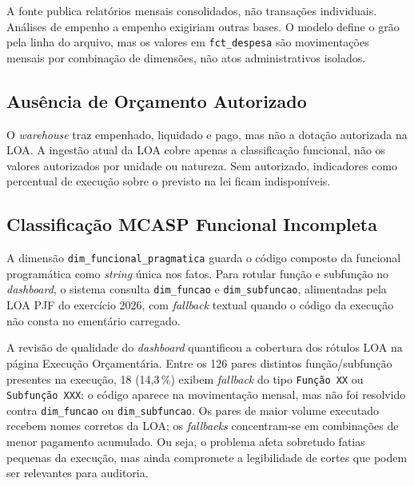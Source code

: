 A fonte publica relatórios mensais consolidados, não transações individuais. Análises de empenho a empenho exigiriam outras bases. O modelo define o grão pela linha do arquivo, mas os valores em \texttt{fct\_despesa} são movimentações mensais por combinação de dimensões, não atos administrativos isolados.

\subsection{Ausência de Orçamento Autorizado}

O \textit{warehouse} traz empenhado, liquidado e pago, mas não a dotação autorizada na LOA. A ingestão atual da LOA cobre apenas a classificação funcional, não os valores autorizados por unidade ou natureza. Sem autorizado, indicadores como percentual de execução sobre o previsto na lei ficam indisponíveis.

\subsection{Classificação MCASP Funcional Incompleta}

A dimensão \texttt{dim\_funcional\_pragmatica} guarda o código composto da funcional programática como \textit{string} única nos fatos. Para rotular função e subfunção no \textit{dashboard}, o sistema consulta \texttt{dim\_funcao} e \texttt{dim\_subfuncao}, alimentadas pela LOA PJF do exercício 2026, com \textit{fallback} textual quando o código da execução não consta no ementário carregado.


A revisão de qualidade do \textit{dashboard} quantificou a cobertura dos rótulos LOA na página Execução Orçamentária. Entre os 126 pares distintos função/subfunção presentes na execução, 18 (14{,}3\,\%) exibem \textit{fallback} do tipo \texttt{Função XX} ou \texttt{Subfunção XXX}: o código aparece na movimentação mensal, mas não foi resolvido contra \texttt{dim\_funcao} ou \texttt{dim\_subfuncao}. Os pares de maior volume executado recebem nomes corretos da LOA; os \textit{fallbacks} concentram-se em combinações de menor pagamento acumulado. Ou seja, o problema afeta sobretudo fatias pequenas da execução, mas ainda compromete a legibilidade de cortes que podem ser relevantes para auditoria.

